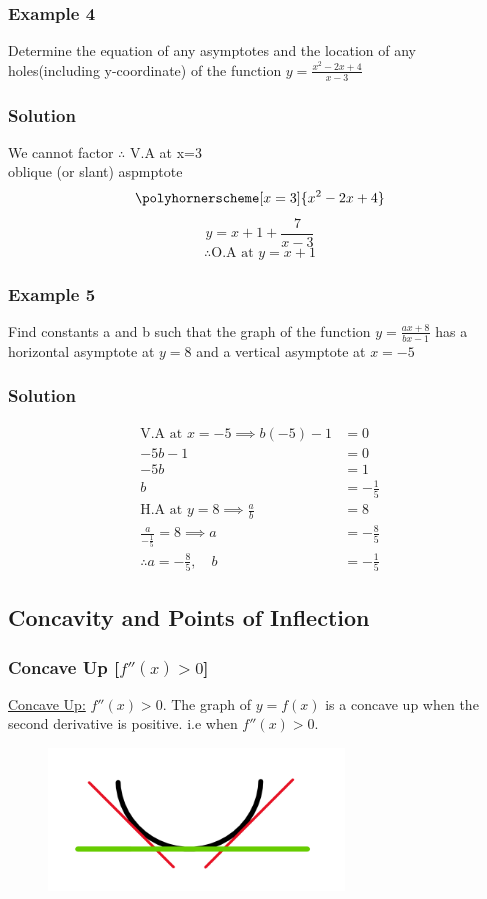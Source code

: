 \documentclass{article}
\begin{document}
\subsubsection{Example 4}
Determine the equation of any asymptotes and the location of any holes(including y-coordinate) of the function $y=\frac{x^2-2x+4}{x-3}$
\subsubsection*{Solution}
We cannot factor
$\therefore$ V.A at x=3\\
oblique (or slant) aspmptote 
$$\polyhornerscheme[x=3]{x^2-2x+4}$$
$$y=x+1+\frac{7}{x-3}$$
$$\therefore \text{O.A at } y=x+1$$
\subsubsection{Example 5}
Find constants a and b such that the graph of the function $y=\frac{ax+8}{bx-1}$ has a horizontal asymptote at $y=8$ and a vertical asymptote at $x=-5$
\subsubsection*{Solution}
\begin{align*}
    \text{V.A at } x=-5 \implies b(-5)-1&=0\\
    -5b-1&=0\\
    -5b&=1\\
    b&=-\frac{1}{5}\\
    \text{H.A at } y=8 \implies \frac{a}{b}&=8\\
    \frac{a}{-\frac{1}{5}}=8 \implies a &=-\frac{8}{5}\\
    \therefore a=-\frac{8}{5}, \quad b&=-\frac{1}{5}
\end{align*}
\newpage
\subsection{Concavity and Points of Inflection}
\subsubsection{Concave Up [$f''(x)>0$]}
\underline{Concave Up:} $f''(x)>0$. The graph of $y=f(x)$ is a concave up when the second derivative is positive. i.e when $f''(x)>0$.
\begin{figure}[ht]
    \centering
    \includegraphics[width=0.7\textwidth]{imgs/concave-up.png}
\end{figure}
\end{document}
